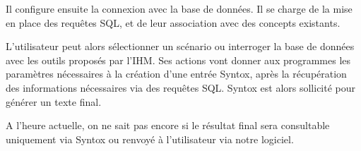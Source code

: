 \documentclass[12pt]{report}
\begin{document}
Il configure ensuite la connexion avec la base de données. Il se charge de la mise en place des requêtes SQL, et de leur association avec des concepts existants.


L'utilisateur peut alors sélectionner un scénario ou interroger la base de données avec les outils proposés par l'IHM. Ses actions vont donner aux programmes les paramètres nécessaires à la création d'une entrée Syntox, après la récupération des informations nécessaires via des requêtes SQL. Syntox est alors sollicité pour générer un texte final.

A l'heure actuelle, on ne sait pas encore si le résultat final sera consultable uniquement via Syntox ou renvoyé à l'utilisateur via notre logiciel.
\end{document}
